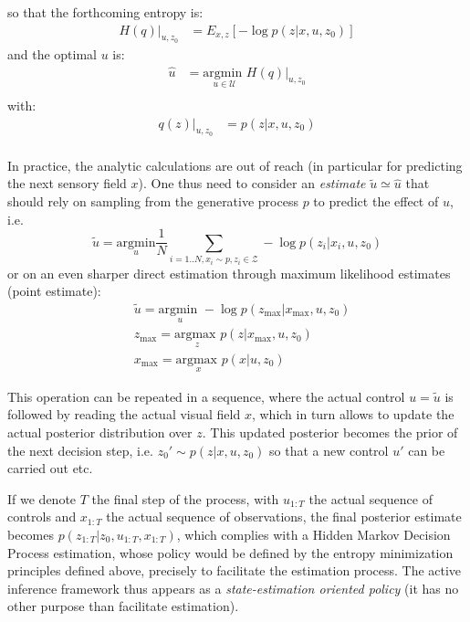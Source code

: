 \documentclass{article} %
\begin{document}
	
	so that the forthcoming entropy is:
	\begin{align*}
	H(q)|_{u, z_0} &=  E_{x,z}\left[-\log  p(z|x,u,z_0)\right]
	\end{align*}
	and the optimal $u$ is:
	\begin{align*}
	\hat{u} &= \underset{u \in \mathcal{U}}{\text{argmin }} H(q)|_{u, z_0} \\
	\end{align*}
	with:
	\begin{align*}
	q(z)|_{u,z_0} &= p(z|x,u,z_0) \\
	\end{align*}
	
	In practice, the analytic calculations are out of reach (in particular for predicting the next sensory field $x$).  One thus need to consider an \emph{estimate} $\tilde{u} \simeq \hat{u}$ that should rely on sampling from the generative process $p$ to 
	predict the effect of $u$,  i.e. 
	$$ \tilde{u} = \underset{u}{\text{argmin}} \frac{1}{N} \sum_{i = 1..N, x_i \sim p, z_i \in \mathcal{Z}} -\log p(z_i| x_i, u, z_0) $$ or on an even sharper direct estimation through maximum likelihood estimates (point estimate):
	\begin{align*}
	&\tilde{u} = \underset{u}{\text{argmin }} - \log p(z_\text{max}|x_\text{max}, u, z_0)	\\
	&z_\text{max} = \underset{z}{\text{argmax }} p(z|x_\text{max}, u, z_0)\\
	&x_\text{max} = \underset{x}{\text{argmax }} p(x|u,z_0)
	\end{align*}


This operation can be repeated in a sequence, where the actual control $u = \tilde{u}$ is followed by reading the actual visual field $x$, which in turn allows to update the actual posterior distribution over $z$. This updated posterior becomes the prior of the next decision step, i.e. $z_0'\sim  p(z|x, u, z_0)$ so that a new control $u'$ can be carried out etc. 

If we denote $T$ the final step of the process,  with $u_{1:T}$ the actual sequence of controls and $x_{1:T}$ the actual sequence of observations, the final posterior estimate becomes $p(z_{1:T}|z_0, u_{1:T}, x_{1:T})$, which complies with a Hidden Markov Decision Process estimation, whose policy would be defined by the entropy minimization principles defined above, precisely to facilitate the estimation process. The active inference framework thus appears  as a \emph{state-estimation oriented policy} (it has no other purpose than facilitate estimation).
\end{document}
